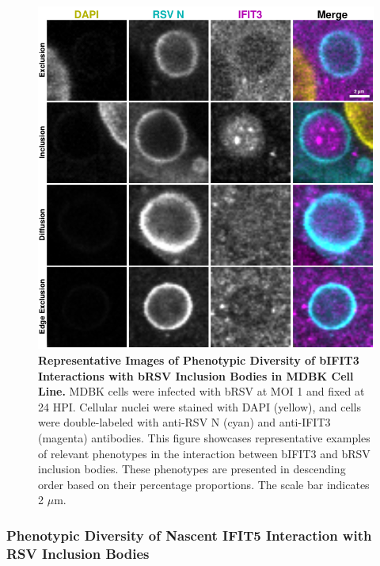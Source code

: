 \begin{figure}
    \centering
    \includegraphics[width=1\linewidth]{08. Chapter 3/Figs/02. Infection/03. IFIT3/09. mdbk i3.pdf}
    \caption[Representative Images of Phenotypic Diversity of bIFIT3 Interactions with bRSV Inclusion Bodies in MDBK Cell Line.]{\textbf{Representative Images of Phenotypic Diversity of bIFIT3 Interactions with bRSV Inclusion Bodies in MDBK Cell Line.} MDBK cells were infected with bRSV at MOI 1 and fixed at 24 HPI. Cellular nuclei were stained with DAPI (yellow), and cells were double-labeled with anti-RSV N (cyan) and anti-IFIT3 (magenta) antibodies. This figure showcases representative examples of relevant phenotypes in the interaction between bIFIT3 and bRSV inclusion bodies. These phenotypes are presented in descending order based on their percentage proportions. The scale bar indicates 2 \(\mu \mbox{m}\).}
    \label{fig:Representative Images of Phenotypic Diversity of bIFIT3 Interactions with bRSV Inclusion Bodies in MDBK Cell Line}
\end{figure}

\subsubsection{Phenotypic Diversity of Nascent IFIT5 Interaction with RSV Inclusion Bodies}

